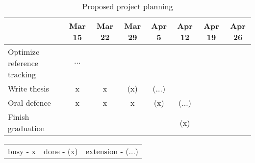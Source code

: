\begin{table}[H]
\begin{tabular}{p{5cm}ccccccc}
                               & Mar 15 & Mar 22 & Mar 29 & Apr 5  & Apr 12 & Apr 19 & Apr 26 \\ \hline
    Optimize reference tracking     & $\dots$    &           &          &       &   &        &   \\ 
    Write thesis               & x   &    x     &   (x)   & ($\dots$)  &        &        &          \\ 
    Oral defence               &  x    &    x   &   x        & (x)   & ($\dots$)    &        &           \\    
    Finish graduation          &      &        &         &           &   (x)     &        &      \\    \hline 

 
    \end{tabular}
    \caption{Proposed project planning}
    \label{tab1:projectplanning}
\end{table}

\begin{table}[H]
    \centering
    \begin{tabular}{ccc}
       busy - x & done - (x) & extension - ($\dots$)
    \end{tabular}
\end{table}



